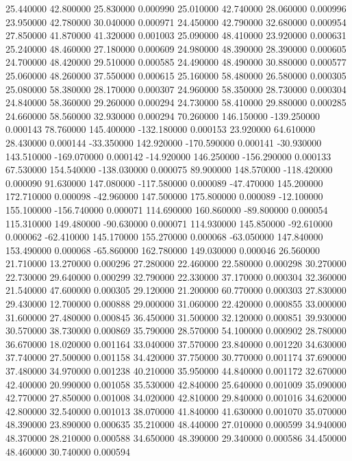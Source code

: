 25.440000 42.800000 25.830000 0.000990 
25.010000 42.740000 28.060000 0.000996 
23.950000 42.780000 30.040000 0.000971 
24.450000 42.790000 32.680000 0.000954 
27.850000 41.870000 41.320000 0.001003 
25.090000 48.410000 23.920000 0.000631 
25.240000 48.460000 27.180000 0.000609 
24.980000 48.390000 28.390000 0.000605 
24.700000 48.420000 29.510000 0.000585 
24.490000 48.490000 30.880000 0.000577 
25.060000 48.260000 37.550000 0.000615 
25.160000 58.480000 26.580000 0.000305 
25.080000 58.380000 28.170000 0.000307 
24.960000 58.350000 28.730000 0.000304 
24.840000 58.360000 29.260000 0.000294 
24.730000 58.410000 29.880000 0.000285 
24.660000 58.560000 32.930000 0.000294 
70.260000 146.150000 -139.250000 0.000143 
78.760000 145.400000 -132.180000 0.000153 
23.920000 64.610000 28.430000 0.000144 
-33.350000 142.920000 -170.590000 0.000141 
-30.930000 143.510000 -169.070000 0.000142 
-14.920000 146.250000 -156.290000 0.000133 
67.530000 154.540000 -138.030000 0.000075 
89.900000 148.570000 -118.420000 0.000090 
91.630000 147.080000 -117.580000 0.000089 
-47.470000 145.200000 172.710000 0.000098 
-42.960000 147.500000 175.800000 0.000089 
-12.100000 155.100000 -156.740000 0.000071 
114.690000 160.860000 -89.800000 0.000054 
115.310000 149.480000 -90.630000 0.000071 
114.930000 145.850000 -92.610000 0.000062 
-62.410000 145.170000 155.270000 0.000068 
-63.050000 147.840000 153.490000 0.000068 
-65.860000 162.780000 149.030000 0.000046 
26.560000 21.710000 13.270000 0.000296 
27.280000 22.460000 22.580000 0.000298 
30.270000 22.730000 29.640000 0.000299 
32.790000 22.330000 37.170000 0.000304 
32.360000 21.540000 47.600000 0.000305 
29.120000 21.200000 60.770000 0.000303 
27.830000 29.430000 12.700000 0.000888 
29.000000 31.060000 22.420000 0.000855 
33.000000 31.600000 27.480000 0.000845 
36.450000 31.500000 32.120000 0.000851 
39.930000 30.570000 38.730000 0.000869 
35.790000 28.570000 54.100000 0.000902 
28.780000 36.670000 18.020000 0.001164 
33.040000 37.570000 23.840000 0.001220 
34.630000 37.740000 27.500000 0.001158 
34.420000 37.750000 30.770000 0.001174 
37.690000 37.480000 34.970000 0.001238 
40.210000 35.950000 44.840000 0.001172 
32.670000 42.400000 20.990000 0.001058 
35.530000 42.840000 25.640000 0.001009 
35.090000 42.770000 27.850000 0.001008 
34.020000 42.810000 29.840000 0.001016 
34.620000 42.800000 32.540000 0.001013 
38.070000 41.840000 41.630000 0.001070 
35.070000 48.390000 23.890000 0.000635 
35.210000 48.440000 27.010000 0.000599 
34.940000 48.370000 28.210000 0.000588 
34.650000 48.390000 29.340000 0.000586 
34.450000 48.460000 30.740000 0.000594 
